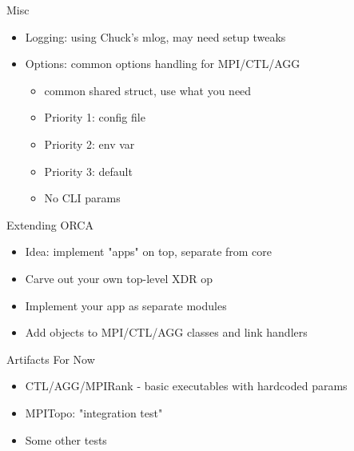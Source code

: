 \documentclass{beamer}
\begin{document}
\begin{frame}{Misc}
	\begin{itemize}
		\item Logging: using Chuck's mlog, may need setup tweaks
		\item Options: common options handling for MPI/CTL/AGG
		      \begin{itemize}
			      \item common shared struct, use what you need
			      \item Priority 1: config file
			      \item Priority 2: env var
			      \item Priority 3: default
			      \item No CLI params
		      \end{itemize}
	\end{itemize}
\end{frame}

\begin{frame}{Extending ORCA}
	\begin{itemize}
		\item Idea: implement "apps" on top, separate from core
		\item Carve out your own top-level XDR op
		\item Implement your app as separate modules
		\item Add objects to MPI/CTL/AGG classes and link handlers
	\end{itemize}
\end{frame}

\begin{frame}{Artifacts For Now}
	\begin{itemize}
		\item CTL/AGG/MPIRank - basic executables with hardcoded params
		\item MPITopo: "integration test"
		\item Some other tests
	\end{itemize}
\end{frame}
\end{document}
